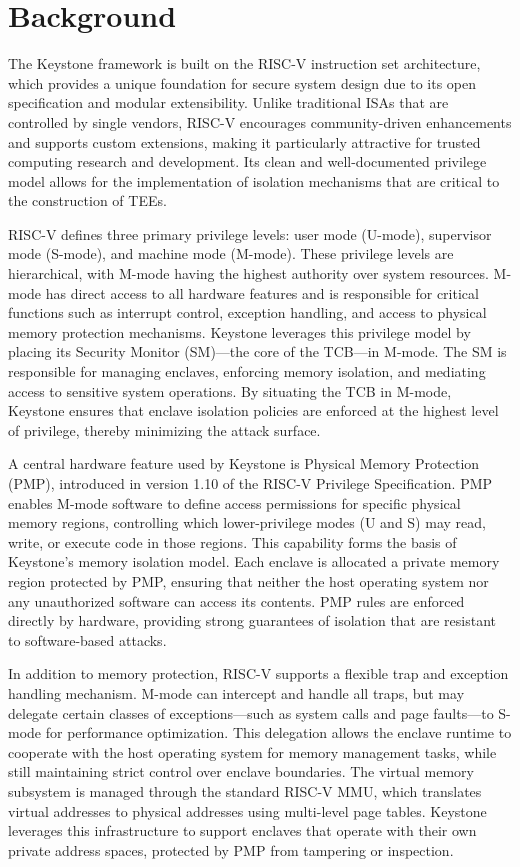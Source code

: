 \chapter{Background}
\label{chap:background}


The Keystone framework is built on the RISC-V instruction set architecture, which provides a unique foundation for secure system design due to its open specification and modular extensibility. Unlike traditional ISAs that are controlled by single vendors, RISC-V encourages community-driven enhancements and supports custom extensions, making it particularly attractive for trusted computing research and development. Its clean and well-documented privilege model allows for the implementation of isolation mechanisms that are critical to the construction of TEEs.

RISC-V defines three primary privilege levels: user mode (U-mode), supervisor mode (S-mode), and machine mode (M-mode). These privilege levels are hierarchical, with M-mode having the highest authority over system resources. M-mode has direct access to all hardware features and is responsible for critical functions such as interrupt control, exception handling, and access to physical memory protection mechanisms. Keystone leverages this privilege model by placing its Security Monitor (SM)—the core of the TCB—in M-mode. The SM is responsible for managing enclaves, enforcing memory isolation, and mediating access to sensitive system operations. By situating the TCB in M-mode, Keystone ensures that enclave isolation policies are enforced at the highest level of privilege, thereby minimizing the attack surface.

A central hardware feature used by Keystone is Physical Memory Protection (PMP), introduced in version 1.10 of the RISC-V Privilege Specification. PMP enables M-mode software to define access permissions for specific physical memory regions, controlling which lower-privilege modes (U and S) may read, write, or execute code in those regions. This capability forms the basis of Keystone’s memory isolation model. Each enclave is allocated a private memory region protected by PMP, ensuring that neither the host operating system nor any unauthorized software can access its contents. PMP rules are enforced directly by hardware, providing strong guarantees of isolation that are resistant to software-based attacks.

In addition to memory protection, RISC-V supports a flexible trap and exception handling mechanism. M-mode can intercept and handle all traps, but may delegate certain classes of exceptions—such as system calls and page faults—to S-mode for performance optimization. This delegation allows the enclave runtime to cooperate with the host operating system for memory management tasks, while still maintaining strict control over enclave boundaries. The virtual memory subsystem is managed through the standard RISC-V MMU, which translates virtual addresses to physical addresses using multi-level page tables. Keystone leverages this infrastructure to support enclaves that operate with their own private address spaces, protected by PMP from tampering or inspection.

